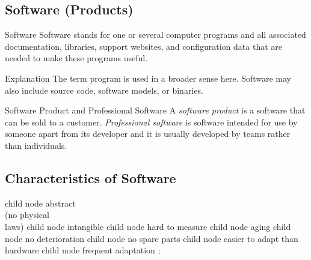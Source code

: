 
\subsection{Software (Products)}
\begin{frame}{\insertsubsection}
	\begin{fancycolumns}
		\begin{definition}{Software }
			Software stands for one or several computer programs and all associated documentation, libraries, support websites, and configuration data that are needed to make these programs useful.
		\end{definition}
		\begin{example}{Explanation}
			The term program is used in a broader sense here. Software may also include source code, software models, or binaries.
		\end{example}
	\nextcolumn
		\begin{definition}{Software Product and Professional Software}
			A \emph{software product} is a software that can be sold to a customer. \emph{Professional software} is software intended for use by someone apart from its developer and it is usually developed by teams rather than individuals. 
		\end{definition}
	\end{fancycolumns}
\end{frame}

\subsection{Characteristics of Software}
\begin{frame}{\insertsubsection}
	\centering\tikz[grow cyclic,
	mindmap, every node/.style=concept,concept color=red!10!background,
	level 1/.append style={level distance=27mm,sibling angle=360/8}]
	child { node {abstract\\(no physical\\laws)} }
	child { node {intangible } }
	child { node {hard to measure} }
	child { node {aging} }
	child { node {no \phantom{abc}deterioration} }
	child { node {no spare parts} }
	child { node {easier to adapt than hardware} }
	child { node {frequent adaptation\phantom{;}} }
	;
\end{frame}

